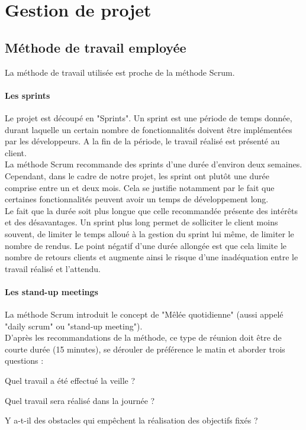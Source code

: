 \newpage


\section{Gestion de projet}
\label{sec:projectManagement}

\subsection{Méthode de travail employée}
La méthode de travail utilisée est proche de la méthode Scrum.
\paragraph*{Les sprints\\}
Le projet est découpé en "Sprints". Un sprint est une période de temps donnée, durant laquelle un certain nombre de fonctionnalités doivent être implémentées par les développeurs. A la fin de la période, le travail réalisé est présenté au client.\\

La méthode Scrum recommande des sprints d'une durée d'environ deux semaines. Cependant, dans le cadre de notre projet, les sprint ont plutôt une durée comprise entre un et deux mois. Cela se justifie notamment par le fait que certaines fonctionnalités peuvent avoir un temps de développement long.\\
Le fait que la durée soit plus longue que celle recommandée présente des intérêts et des désavantages. 
Un sprint plus long permet de solliciter le client moins souvent, de limiter le temps alloué à la gestion du sprint lui même, de limiter le nombre de rendus.
Le point négatif d'une durée allongée est que cela limite le nombre de retours clients et augmente ainsi le risque d'une inadéquation entre le travail réalisé et l'attendu.

\paragraph*{Les stand-up meetings\\}
La méthode Scrum introduit le concept de "Mêlée quotidienne" (aussi appelé "daily scrum" ou "stand-up meeting")\cite{bib:dailyScrum}.\\
D'après les recommandations de la méthode, ce type de réunion doit être de courte durée (15 minutes), se dérouler de préférence le matin et aborder trois questions :
\begin{sitemize}
	\item Quel travail a été effectué la veille ?
	\item Quel travail sera réalisé dans la journée ?
	\item Y a-t-il des obstacles qui empêchent la réalisation des objectifs fixés ?
\end{sitemize}


